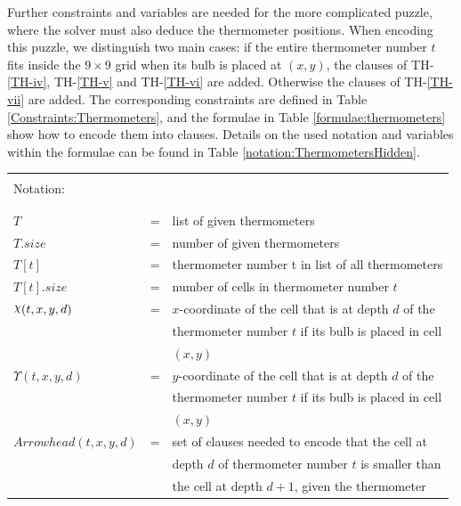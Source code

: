 Further constraints and variables are needed for the more complicated puzzle, where the solver must also deduce the thermometer positions. When encoding this puzzle, we distinguish two main cases: if the entire thermometer number $t$ fits inside the $9\times9$ grid when its bulb is placed at $(x,y)$, the clauses of TH-\ref{TH-iv}, TH-\ref{TH-v} and TH-\ref{TH-vi} are added. Otherwise the clauses of TH-\ref{TH-vii} are added. The corresponding constraints are defined in Table \ref{Constraints:Thermometers}, and the formulae in Table \ref{formulae:thermometers} show how to encode them into clauses. Details on the used notation and variables within the formulae can be found in Table \ref{notation:ThermometersHidden}.


\begin{table}[!ht]
    \centering
    \begin{tabular}{l c l}
    \hline
    \\
    Notation: &&\\
    \\
    \hline
    \\
    $T$                     &= &list of given thermometers\\
    $T.size$                &= &number of given thermometers\\
    $T[t]$                  &= &thermometer number t in list of all thermometers\\
    $T[t].size$             &= &number of cells in thermometer number $t$\\
    $\rchi(t,x,y,d)$           &= &$x$-coordinate of the cell that is at depth $d$ of the\\
                            &  &thermometer number $t$ if its bulb is placed in cell\\
                            &  &$(x,y)$\\
    $\Upsilon(t,x,y,d)$           &= &$y$-coordinate of the cell that is at depth $d$ of the\\
                            &  &thermometer number $t$ if its bulb is placed in cell\\
                            &  &$(x,y)$\\
    $Arrowhead(t,x,y,d)$    &= &set of clauses needed to encode that the cell at\\
                            &  &depth $d$ of thermometer number $t$ is smaller than\\
                            &  &the cell at depth $d+1$, given the thermometer\\

\end{tabular}
\end{table}
